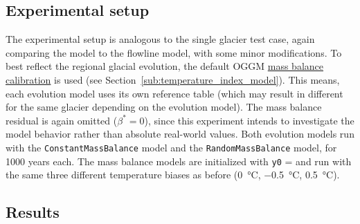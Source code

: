     \subsection{Experimental setup} %
    \label{sub:experimental_setup_regional_run}

        The experimental setup is analogous to the single glacier test case, again comparing the \vas{} model to the flowline model, with some minor modifications. To best reflect the regional glacial evolution, the default OGGM \hyperref[ssub:mb_calib]{mass balance calibration} is used (see Section~\ref{sub:temperature_index_model}). This means, each evolution model uses its own \tstar{} reference table (which may result in different \tstar{} for the same glacier depending on the evolution model). The mass balance residual is again omitted ($\beta^* = 0$), since this experiment intends to investigate the model behavior rather than absolute real-world values.
        Both evolution models run with the \lstinline`ConstantMassBalance` model and the \lstinline`RandomMassBalance` model, for 1000 years each. The mass balance models are initialized with \lstinline`y0` = \tstar{} and run with the same three different temperature biases as before (\SI{0}{\celsius}, \SI{-0.5}{\celsius}, \SI{+0.5}{\celsius}).
    

    \subsection{Results} %
    \label{sub:results_regional_run}

